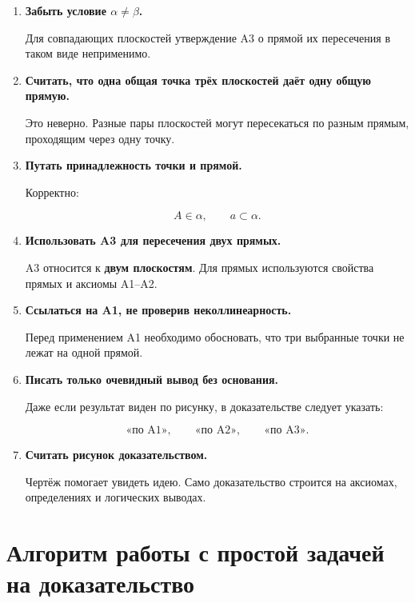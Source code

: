 \documentclass[a4paper,12pt]{article}
\begin{document}
\begin{enumerate}
  \item
  \textbf{Забыть условие \(\alpha\ne\beta\).}

  Для совпадающих плоскостей утверждение A3
  о прямой их пересечения в таком виде неприменимо.

  \item
  \textbf{Считать, что одна общая точка трёх плоскостей
  даёт одну общую прямую.}

  Это неверно. Разные пары плоскостей могут пересекаться
  по разным прямым, проходящим через одну точку.

  \item
  \textbf{Путать принадлежность точки и прямой.}

  Корректно:

  \[
  A\in\alpha,\qquad a\subset\alpha.
  \]

  \item
  \textbf{Использовать A3 для пересечения двух прямых.}

  A3 относится к \textbf{двум плоскостям}.
  Для прямых используются свойства прямых и аксиомы A1--A2.

  \item
  \textbf{Ссылаться на A1, не проверив неколлинеарность.}

  Перед применением A1 необходимо обосновать,
  что три выбранные точки не лежат на одной прямой.

  \item
  \textbf{Писать только очевидный вывод без основания.}

  Даже если результат виден по рисунку, в доказательстве следует указать:

  \[
  \text{«по A1»},\qquad
  \text{«по A2»},\qquad
  \text{«по A3»}.
  \]

  \item
  \textbf{Считать рисунок доказательством.}

  Чертёж помогает увидеть идею.
  Само доказательство строится на аксиомах,
  определениях и логических выводах.
\end{enumerate}


\section{Алгоритм работы с простой задачей на доказательство}
\end{document}
